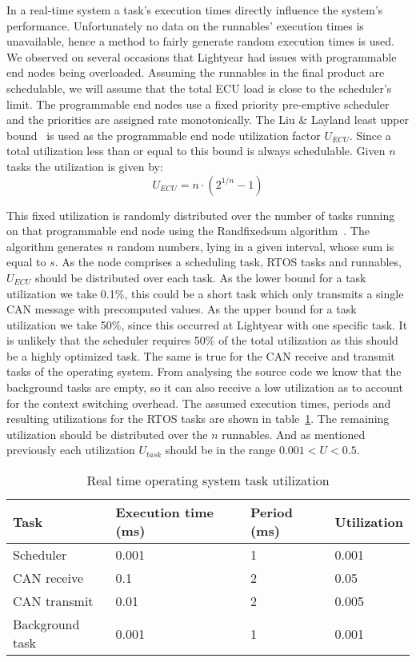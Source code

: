 In a real-time system a task's execution times directly influence the system's performance. Unfortunately no data on the runnables' execution times is unavailable, hence a method to fairly generate random execution times is used. We observed on several occasions that Lightyear had issues with programmable end nodes being overloaded. Assuming the runnables in the final product are schedulable, we will assume that the total ECU load is close to the scheduler's limit. The programmable end nodes use a fixed priority pre-emptive scheduler and the priorities are assigned rate monotonically. The Liu \& Layland least upper bound~\cite{liu1973scheduling} is used as the programmable end node utilization factor $U_{ECU}$. Since a total utilization less than or equal to this bound is always schedulable. Given $n$ tasks the utilization is given by:
\begin{equation}
    U_{ECU} = n \cdot (2^{1/n} -1)
\end{equation}

This fixed utilization is randomly distributed over the number of tasks running on that programmable end node using the Randfixedsum algorithm~\cite{emberson2010techniques}. The algorithm generates $n$ random numbers, lying in a given interval, whose sum is equal to $s$. As the node comprises a scheduling task, RTOS tasks and runnables, $U_{ECU}$ should be distributed over each task. As the lower bound for a task utilization we take 0.1\%, this could be a short task which only transmits a single CAN message with precomputed values. As the upper bound for a task utilization we take 50\%, since this occurred at Lightyear with one specific task. It is unlikely that the scheduler requires 50\% of the total utilization as this should be a highly optimized task. The same is true for the CAN receive and transmit tasks of the operating system. From analysing the source code we know that the background tasks are empty, so it can also receive a low utilization as to account for the context switching overhead. The assumed execution times, periods and resulting utilizations for the RTOS tasks are shown in table~\ref{tab:util}. The remaining utilization should be distributed over the $n$ runnables. And as mentioned previously each utilization $U_{task}$ should be in the range $0.001 < U < 0.5$.

\begin{table}[htb]
    \centering
    \begin{tabular}{@{}llll@{}}
    \toprule
    Task            & Execution time (ms) & Period (ms) & Utilization \\ \midrule
    Scheduler       & 0.001               & 1           & 0.001       \\
    CAN receive     & 0.1                 & 2           & 0.05        \\
    CAN transmit    & 0.01                & 2           & 0.005       \\
    Background task & 0.001               & 1           & 0.001       \\ \bottomrule
    \end{tabular}
    \caption{Real time operating system task utilization}
    \label{tab:util}
\end{table}

